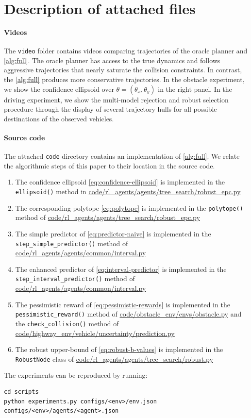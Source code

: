 \documentclass{article}
\begin{document}
\section{Description of attached files}
\label{sec:attachments}

\paragraph{Videos}
The \texttt{video} folder contains videos comparing trajectories of the oracle planner and \autoref{alg:full}. The oracle planner has access to the true dynamics and follows aggressive trajectories that nearly saturate the collision constraints. In contrast, the \autoref{alg:full} produces more conservative trajectories. In the obstacle experiment, we show the confidence ellipsoid over $\theta = (\theta_x,\theta_y)$ in the right panel. In the driving experiment, we show the multi-model rejection and robust selection procedure through the display of several trajectory hulls for all possible destinations of the observed vehicles.

\paragraph{Source code}
The attached \texttt{code} directory contains an implementation of \autoref{alg:full}. We relate the algorithmic steps of this paper to their location in the source code.
\begin{enumerate}
	\item The confidence ellipsoid \eqref{eq:confidence-ellipsoid} is implemented in the \texttt{ellipsoid()} method in \url{code/rl_agents/agents/tree_search/robust_epc.py}
	\item The corresponding polytope \eqref{eq:polytope} is implemented in the \texttt{polytope()} method of \url{code/rl_agents/agents/tree_search/robust_epc.py}
	\item The simple predictor of \eqref{eq:predictor-naive} is implemented in the \texttt{step\_simple\_predictor()} method of \url{code/rl_agents/agents/common/interval.py}
	\item The enhanced predictor of \eqref{eq:interval-predictor} is implemented in the \texttt{step\_interval\_predictor()} method of \url{code/rl_agents/agents/common/interval.py}
	\item The pessimistic reward of \eqref{eq:pessimistic-rewards} is implemented in the \texttt{pessimistic\_reward()} method of \url{code/obstacle_env/envs/obstacle.py} and the \texttt{check\_collision()} method of \url{code/highway_env/vehicle/uncertainty/prediction.py}
	\item The robust upper-bound of \eqref{eq:robust-b-values} is implemented in the \texttt{RobustNode} class of \url{code/rl_agents/agents/tree_search/robust.py}
\end{enumerate}
The experiments can be reproduced by running:
\lstset{language=bash}
\begin{lstlisting}
cd scripts
python experiments.py configs/<env>/env.json configs/<env>/agents/<agent>.json
\end{lstlisting}
\end{document}
